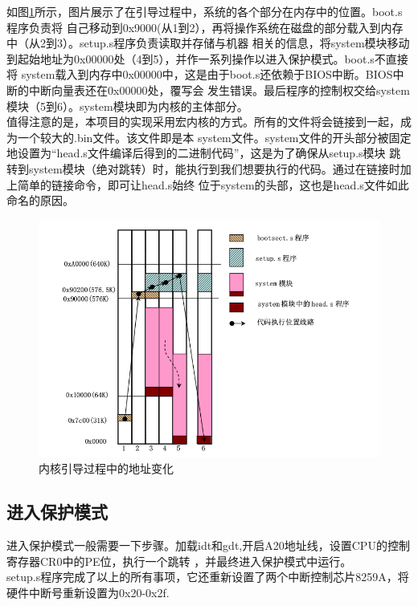 \documentclass[a4paper]{article}
\begin{document}
    
    如图\ref{fig:boot_address}所示，图片展示了在引导过程中，系统的各个部分在内存中的位置。boot.s程序负责将
    自己移动到0x9000(从1到2），再将操作系统在磁盘的部分载入到内存中（从2到3）。setup.s程序负责读取并存储与机器
    相关的信息，将system模块移动到起始地址为0x00000处（4到5），并作一系列操作以进入保护模式。boot.s不直接将
    system载入到内存中0x00000中，这是由于boot.s还依赖于BIOS中断。BIOS中断的中断向量表还在0x00000处，覆写会
    发生错误。最后程序的控制权交给system模块（5到6）。system模块即为内核的主体部分。\\ 

    值得注意的是，本项目的实现采用宏内核的方式。所有的文件将会链接到一起，成为一个较大的.bin文件。该文件即是本
    system文件。system文件的开头部分被固定地设置为``head.s文件编译后得到的二进制代码''，这是为了确保从setup.s模块
    跳转到system模块（绝对跳转）时，能执行到我们想要执行的代码。通过在链接时加上简单的链接命令，即可让head.s始终
    位于system的头部，这也是head.s文件如此命名的原因。
    \begin{figure}[!hbt]
        \begin{center}
        \includegraphics[scale=0.6]{assets/boot_address.png}
        \caption{内核引导过程中的地址变化\label{fig:boot_address}} 
        \end{center} 
    \end{figure} 
    

    \subsection{进入保护模式}\label{sec:pm}
        进入保护模式一般需要一下步骤。加载idt和gdt,开启A20地址线，设置CPU的控制寄存器CR0中的PE位，执行一个跳转
        ，并最终进入保护模式中运行。\\ 
        setup.s程序完成了以上的所有事项，它还重新设置了两个中断控制芯片8259A，将硬件中断号重新设置为0x20-0x2f.\\ 
\end{document}
